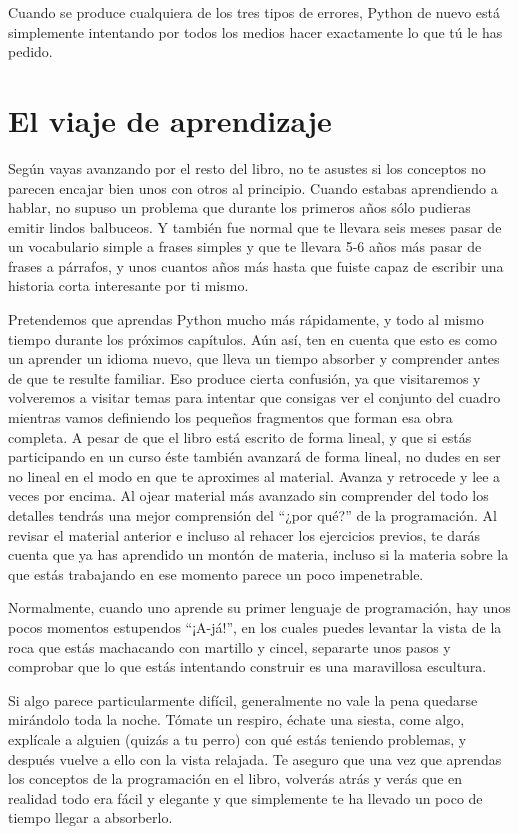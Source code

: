 Cuando se produce cualquiera de los tres tipos de errores, Python de nuevo está
simplemente intentando por todos los medios hacer exactamente lo que tú le has pedido.

\section{El viaje de aprendizaje}

Según vayas avanzando por el resto del libro, no te asustes si los conceptos
no parecen encajar bien unos con otros al principio. Cuando estabas aprendiendo a hablar,
no supuso un problema que durante los primeros años sólo pudieras emitir lindos
balbuceos. Y también fue normal que te llevara seis meses pasar de un vocabulario simple
a frases simples y que te llevara 5-6 años más pasar de frases a párrafos, y unos cuantos
años más hasta que fuiste capaz de escribir una historia corta interesante por ti mismo.

Pretendemos que aprendas Python mucho más rápidamente, y todo al mismo tiempo
durante los próximos capítulos.
Aún así, ten en cuenta que esto es como un aprender un idioma nuevo, que lleva un tiempo
absorber y comprender antes de que te resulte familiar.
Eso produce cierta confusión, ya que visitaremos y volveremos a visitar
temas para intentar que consigas ver el conjunto del cuadro mientras vamos definiendo
los pequeños fragmentos que forman esa obra completa. A pesar de que el libro está
escrito de forma lineal, y que si estás participando en un curso éste también avanzará
de forma lineal, no dudes en ser no lineal en el modo en que te aproximes al material.
Avanza y retrocede y lee a veces por encima. Al ojear material más avanzado sin comprender del
todo los detalles tendrás una mejor comprensión del ``¿por qué?'' de la programación.
Al revisar el material anterior e incluso al rehacer los ejercicios previos,
te darás cuenta que ya has aprendido un montón de materia, incluso si la materia
sobre la que estás trabajando en ese momento parece un poco impenetrable.

Normalmente, cuando uno aprende su primer lenguaje de programación, hay unos pocos
momentos estupendos ``¡A-já!'', en los cuales puedes levantar la vista de la roca que
estás machacando con martillo y cincel, separarte unos pasos y comprobar
que lo que estás intentando construir es una maravillosa escultura.

Si algo parece particularmente difícil, generalmente no vale la pena quedarse mirándolo
toda la noche. Tómate un respiro, échate una siesta, come algo, explícale a alguien
(quizás a tu perro) con qué estás teniendo problemas, y después vuelve a ello con la
vista relajada. Te aseguro que una vez que aprendas los conceptos de la programación en
el libro, volverás atrás y verás que en realidad todo era fácil y elegante y que
simplemente te ha llevado un poco de tiempo llegar a absorberlo.

